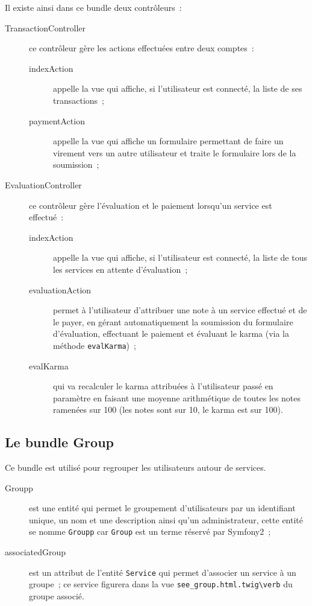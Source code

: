 Il existe ainsi dans ce bundle deux contrôleurs~:
\begin{description}
    \item[TransactionController] ce contrôleur gère les actions effectuées entre deux comptes~:
    \begin{description}
        \item[indexAction] appelle la vue qui affiche, si l'utilisateur est connecté, la liste de ses transactions~;
        \item[paymentAction] appelle la vue qui affiche un formulaire permettant de faire un virement vers un autre utilisateur et traite le formulaire lors de la soumission~;
    \end{description}
    \item[EvaluationController] ce contrôleur gère l'évaluation et le paiement lorsqu'un service est effectué~:
    \begin{description}
        \item[indexAction] appelle la vue qui affiche, si l'utilisateur est connecté, la liste de tous les services en attente d'évaluation~;
        \item[evaluationAction] permet à l'utilisateur d'attribuer une note à un service effectué et de le payer, en gérant automatiquement la soumission du formulaire d'évaluation, effectuant le paiement et évaluant le karma (via la méthode \verb|evalKarma|)~;
        \item[evalKarma] qui va recalculer le karma attribuées à l'utilisateur passé en paramètre en faisant une moyenne arithmétique de toutes les notes ramenées sur 100 (les notes sont sur 10, le karma est sur 100).
    \end{description}
\end{description}

\subsection{Le bundle Group}

Ce bundle est utilisé pour regrouper les utilisateurs autour de services.

\begin{description}
    \item [Groupp] est une entité qui permet le groupement d'utilisateurs par un identifiant unique, un nom et une description ainsi qu'un administrateur, cette entité se nomme \verb|Groupp| car \verb|Group| est un terme réservé par Symfony2~;
    \item [associatedGroup] est un attribut de l'entité \verb|Service| qui permet d'associer un service à un groupe~; ce service figurera dans la vue \verb|see_group.html.twig\verb| du groupe associé.
\end{description} 

